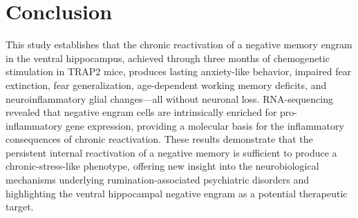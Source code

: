 \documentclass[11pt]{article}
\begin{document}
\section{Conclusion}

This study establishes that the chronic reactivation of a negative memory engram in the ventral hippocampus, achieved through three months of chemogenetic stimulation in TRAP2 mice, produces lasting anxiety-like behavior, impaired fear extinction, fear generalization, age-dependent working memory deficits, and neuroinflammatory glial changes---all without neuronal loss. RNA-sequencing revealed that negative engram cells are intrinsically enriched for pro-inflammatory gene expression, providing a molecular basis for the inflammatory consequences of chronic reactivation. These results demonstrate that the persistent internal reactivation of a negative memory is sufficient to produce a chronic-stress-like phenotype, offering new insight into the neurobiological mechanisms underlying rumination-associated psychiatric disorders and highlighting the ventral hippocampal negative engram as a potential therapeutic target.



\end{document}
